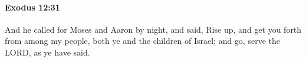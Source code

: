 
		\paragraph{Exodus 12:31} %
			\label{EXODUS-12-31}

			And he called for Moses and Aaron by night, and said, Rise up, and get you forth from among my people, both ye and the children of Israel; and go, serve the LORD, as ye have said.


